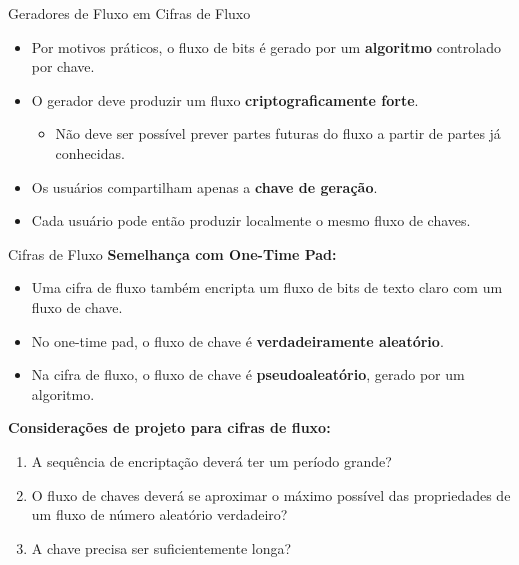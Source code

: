 \begin{frame}{Geradores de Fluxo em Cifras de Fluxo}
    \begin{itemize}
        \item Por motivos práticos, o fluxo de bits é gerado por um \textbf{algoritmo} controlado por chave.
        \item O gerador deve produzir um fluxo \textbf{criptograficamente forte}.
        \begin{itemize}
            \item Não deve ser possível prever partes futuras do fluxo a partir de partes já conhecidas.
        \end{itemize}
        \item Os usuários compartilham apenas a \textbf{chave de geração}.
        \item Cada usuário pode então produzir localmente o mesmo fluxo de chaves.
    \end{itemize}
\end{frame}

\begin{frame}{Cifras de Fluxo}
\textbf{Semelhança com One-Time Pad:} 
\begin{itemize}
    \item Uma cifra de fluxo também encripta um fluxo de bits de texto claro com um fluxo de chave.
    \item No one-time pad, o fluxo de chave é \textbf{verdadeiramente aleatório}.
    \item Na cifra de fluxo, o fluxo de chave é \textbf{pseudoaleatório}, gerado por um algoritmo.
\end{itemize}

\textbf{Considerações de projeto para cifras de fluxo:}
\begin{enumerate}
    \item A sequência de encriptação deverá ter um período grande?
    \item O fluxo de chaves deverá se aproximar o máximo possível das propriedades de um fluxo de número
aleatório verdadeiro?
    \item A  chave precisa ser suficientemente longa?
\end{enumerate}
\end{frame}

